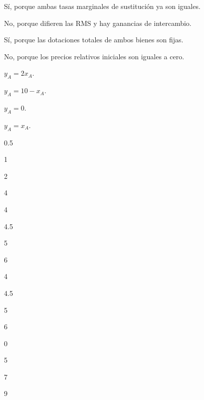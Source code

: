 \begin{opts}
    \item Sí, porque ambas tasas marginales de sustitución ya son iguales.
    \item No, porque difieren las RMS y hay ganancias de intercambio.
    \item Sí, porque las dotaciones totales de ambos bienes son fijas.
    \item No, porque los precios relativos iniciales son iguales a cero.
\end{opts}

\begin{opts}
    \item $y_A=2x_A$.
    \item $y_A=10-x_A$.
    \item $y_A=0$.
    \item $y_A=x_A$.
\end{opts}

\begin{opts}
    \item 0.5
    \item 1
    \item 2
    \item 4
\end{opts}

\begin{opts}
    \item 4
    \item 4.5
    \item 5
    \item 6
\end{opts}

\begin{opts}
    \item 4
    \item 4.5
    \item 5
    \item 6
\end{opts}

\begin{opts}
    \item 0
    \item 5
    \item 7
    \item 9
\end{opts}


